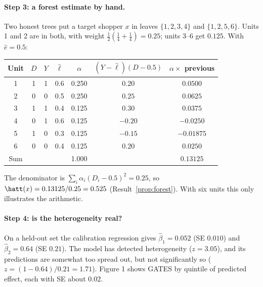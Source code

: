 \documentclass[11pt]{article}
\begin{document}
\paragraph{Step 3: a forest estimate by hand.} Two honest trees put a target shopper $x$ in leaves $\{1,2,3,4\}$ and
$\{1,2,5,6\}$. Units 1 and 2 are in both, with weight $\tfrac12(\tfrac14 + \tfrac14) = 0.25$; units 3--6 get $0.125$.
With $\hat e = 0.5$:
\begin{center}
\begin{tabular}{ccccccc}
\toprule
Unit & $D$ & $Y$ & $\hat\ell$ & $\alpha$ & $(Y - \hat\ell)(D - 0.5)$ & $\alpha \times$ previous \\
\midrule
1 & 1 & 1 & 0.6 & 0.250 & $0.20$ & $0.0500$ \\
2 & 0 & 0 & 0.5 & 0.250 & $0.25$ & $0.0625$ \\
3 & 1 & 1 & 0.4 & 0.125 & $0.30$ & $0.0375$ \\
4 & 0 & 1 & 0.6 & 0.125 & $-0.20$ & $-0.0250$ \\
5 & 1 & 0 & 0.3 & 0.125 & $-0.15$ & $-0.01875$ \\
6 & 0 & 0 & 0.4 & 0.125 & $0.20$ & $0.0250$ \\
\midrule
Sum & & & & 1.000 & & $0.13125$ \\
\bottomrule
\end{tabular}
\end{center}
The denominator is $\sum_i \alpha_i(D_i - 0.5)^2 = 0.25$, so $\hatt(x) = 0.13125/0.25 = 0.525$ (Result~\ref{prop:forest}).
With six units this only illustrates the arithmetic.

\paragraph{Step 4: is the heterogeneity real?} On a held-out set the calibration regression gives $\hat\beta_1 = 0.052$
(SE $0.010$) and $\hat\beta_2 = 0.64$ (SE $0.21$). The model has detected heterogeneity ($z = 3.05$), and its
predictions are somewhat too spread out, but not significantly so ($z = (1 - 0.64)/0.21 = 1.71$). Figure 1 shows
GATES by quintile of predicted effect, each with SE about $0.02$.
\end{document}
